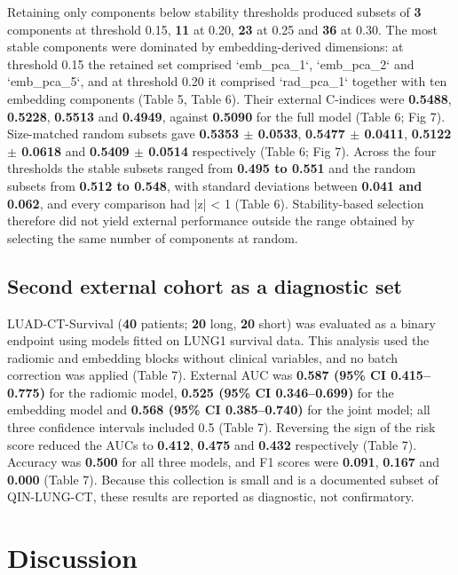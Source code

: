 \documentclass[a4paper,fleqn]{cas-sc}
\begin{document}
Retaining only components below stability thresholds produced subsets of \textbf{3} components at threshold 0.15, \textbf{11} at 0.20, \textbf{23} at 0.25 and \textbf{36} at 0.30. The most stable components were dominated by embedding-derived dimensions: at threshold 0.15 the retained set comprised `emb\_pca\_1`, `emb\_pca\_2` and `emb\_pca\_5`, and at threshold 0.20 it comprised `rad\_pca\_1` together with ten embedding components (Table 5, Table 6). Their external C-indices were \textbf{0.5488}, \textbf{0.5228}, \textbf{0.5513} and \textbf{0.4949}, against \textbf{0.5090} for the full model (Table 6; Fig 7). Size-matched random subsets gave \textbf{0.5353 $\pm$ 0.0533}, \textbf{0.5477 $\pm$ 0.0411}, \textbf{0.5122 $\pm$ 0.0618} and \textbf{0.5409 $\pm$ 0.0514} respectively (Table 6; Fig 7). Across the four thresholds the stable subsets ranged from \textbf{0.495 to 0.551} and the random subsets from \textbf{0.512 to 0.548}, with standard deviations between \textbf{0.041 and 0.062}, and every comparison had |z| < 1 (Table 6). Stability-based selection therefore did not yield external performance outside the range obtained by selecting the same number of components at random.

\subsection{Second external cohort as a diagnostic set}

LUAD-CT-Survival (\textbf{40} patients; \textbf{20} long, \textbf{20} short) was evaluated as a binary endpoint using models fitted on LUNG1 survival data. This analysis used the radiomic and embedding blocks without clinical variables, and no batch correction was applied (Table 7). External AUC was \textbf{0.587 (95\% CI 0.415--0.775)} for the radiomic model, \textbf{0.525 (95\% CI 0.346--0.699)} for the embedding model and \textbf{0.568 (95\% CI 0.385--0.740)} for the joint model; all three confidence intervals included 0.5 (Table 7). Reversing the sign of the risk score reduced the AUCs to \textbf{0.412}, \textbf{0.475} and \textbf{0.432} respectively (Table 7). Accuracy was \textbf{0.500} for all three models, and F1 scores were \textbf{0.091}, \textbf{0.167} and \textbf{0.000} (Table 7). Because this collection is small and is a documented subset of QIN-LUNG-CT, these results are reported as diagnostic, not confirmatory.

\section{Discussion}
\end{document}
